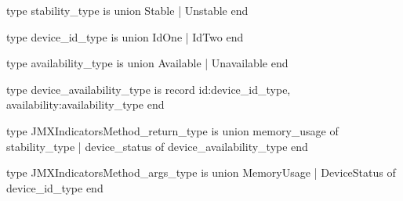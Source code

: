 type stability_type is union
  Stable
| Unstable
end

type device_id_type is union
   IdOne
 | IdTwo
end

type availability_type is union
   Available
 | Unavailable	
end

type device_availability_type is record 
  id:device_id_type, 
  availability:availability_type 
end

type JMXIndicatorsMethod_return_type is union
	  memory_usage of stability_type   
  | device_status of device_availability_type
end

type JMXIndicatorsMethod_args_type is union
	  MemoryUsage 
  | DeviceStatus of device_id_type
end